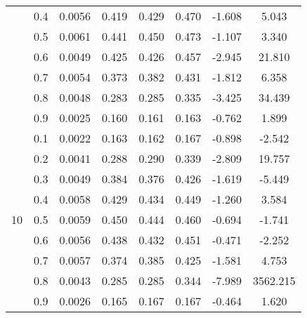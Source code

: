 \documentclass[11pt,a4paper]{report}
\begin{document}
\begin{longtable}{ | c | c || c | c | c | c | c | c | }
 & 0.4 & 0.0056 & 0.419 & 0.429 & 0.470 & -1.608 & 5.043 \\
 & 0.5 & 0.0061 & 0.441 & 0.450 & 0.473 & -1.107 & 3.340 \\
 & 0.6 & 0.0049 & 0.425 & 0.426 & 0.457 & -2.945 & 21.810 \\
 & 0.7 & 0.0054 & 0.373 & 0.382 & 0.431 & -1.812 & 6.358 \\
 & 0.8 & 0.0048 & 0.283 & 0.285 & 0.335 & -3.425 & 34.439 \\
 & 0.9 & 0.0025 & 0.160 & 0.161 & 0.163 & -0.762 & 1.899 \\
 \hline
\multirow{9}{*}{10} & 0.1 & 0.0022 & 0.163 & 0.162 & 0.167 & -0.898 & -2.542 \\
 & 0.2 & 0.0041 & 0.288 & 0.290 & 0.339 & -2.809 & 19.757 \\
 & 0.3 & 0.0049 & 0.384 & 0.376 & 0.426 & -1.619 & -5.449 \\
 & 0.4 & 0.0058 & 0.429 & 0.434 & 0.449 & -1.260 & 3.584 \\
 & 0.5 & 0.0059 & 0.450 & 0.444 & 0.460 & -0.694 & -1.741 \\
 & 0.6 & 0.0056 & 0.438 & 0.432 & 0.451 & -0.471 & -2.252 \\
 & 0.7 & 0.0057 & 0.374 & 0.385 & 0.425 & -1.581 & 4.753 \\
 & 0.8 & 0.0043 & 0.285 & 0.285 & 0.344 & -7.989 & 3562.215 \\
 & 0.9 & 0.0026 & 0.165 & 0.167 & 0.167 & -0.464 & 1.620 \\
 \hline
\hline
\end{longtable}
\end{document}
